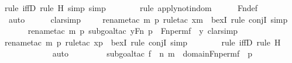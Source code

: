 \begin{isabellebody}
{\isacharparenleft}{\kern0pt}rule\ iffD{}{\isacharcomma}{\kern0pt}\ rule\ H{\isacharcomma}{\kern0pt}\ simp{\isacharcomma}{\kern0pt}\ simp{\isacharparenright}{\kern0pt}\isanewline
\ \ \ \ \ \ \ \isamarkupfalse%
{\isacharparenleft}{\kern0pt}rule\ apply{\isacharunderscore}{\kern0pt}not{}{\isacharunderscore}{\kern0pt}indom{\isacharparenright}{\kern0pt}\isanewline
\ \ \ \ \isamarkupfalse%
\ Fn{\isacharunderscore}{\kern0pt}def\ \isanewline
\ \ \ \ \ \ \ \ \isamarkupfalse%
\ auto{\isacharbrackleft}{\kern0pt}{}{\isacharbrackright}{\kern0pt}\isanewline
\ \ \ \ \isamarkupfalse%
\ clarsimp\isanewline
\ \ \ \ \isamarkupfalse%
{\isacharparenleft}{\kern0pt}rename{\isacharunderscore}{\kern0pt}tac\ m\ p{\isacharcomma}{\kern0pt}\ rule{\isacharunderscore}{\kern0pt}tac\ x{\isacharequal}{\kern0pt}m\ \ bexI{\isacharcomma}{\kern0pt}\ rule\ conjI{\isacharcomma}{\kern0pt}\ simp{\isacharparenright}{\kern0pt}\isanewline
\ \ \ \ \ \isamarkupfalse%
{\isacharparenleft}{\kern0pt}rename{\isacharunderscore}{\kern0pt}tac\ m\ p{\isacharcomma}{\kern0pt}\ subgoal{\isacharunderscore}{\kern0pt}tac\ {\isachardoublequoteopen}{\isasymexists}y{\isasymin}Fn{\isachardot}{\kern0pt}\ p\ {\isacharequal}{\kern0pt}\ Fn{\isacharunderscore}{\kern0pt}perm{\isacharprime}{\kern0pt}{\isacharparenleft}{\kern0pt}f{\isacharparenright}{\kern0pt}\ {\isacharbackquote}{\kern0pt}\ y{\isachardoublequoteclose}{\isacharcomma}{\kern0pt}\ clarsimp{\isacharparenright}{\kern0pt}\isanewline
\ \ \ \ \ \ \isamarkupfalse%
{\isacharparenleft}{\kern0pt}rename{\isacharunderscore}{\kern0pt}tac\ m\ p{\isacharcomma}{\kern0pt}\ rule{\isacharunderscore}{\kern0pt}tac\ x{\isacharequal}{\kern0pt}p\ \ bexI{\isacharcomma}{\kern0pt}\ rule\ conjI{\isacharcomma}{\kern0pt}\ simp{\isacharparenright}{\kern0pt}\isanewline
\ \ \ \ \ \ \ \isamarkupfalse%
{\isacharparenleft}{\kern0pt}rule\ iffD{}{\isacharcomma}{\kern0pt}\ rule\ H{\isacharparenright}{\kern0pt}\isanewline
\ \ \ \ \ \ \ \ \ \ \isamarkupfalse%
\ auto{\isacharbrackleft}{\kern0pt}{}{\isacharbrackright}{\kern0pt}\isanewline
\ \ \ \ \ \ \ \ \isamarkupfalse%
{\isacharparenleft}{\kern0pt}subgoal{\isacharunderscore}{\kern0pt}tac\ {\isachardoublequoteopen}{\isasymlangle}f\ {\isacharbackquote}{\kern0pt}\ n{\isacharcomma}{\kern0pt}\ m{\isasymrangle}\ {\isasymin}\ domain{\isacharparenleft}{\kern0pt}Fn{\isacharunderscore}{\kern0pt}perm{\isacharprime}{\kern0pt}{\isacharparenleft}{\kern0pt}f{\isacharparenright}{\kern0pt}\ {\isacharbackquote}{\kern0pt}\ p{\isacharparenright}{\kern0pt}{\isachardoublequoteclose}{\isacharparenright}{\kern0pt}\isanewline

\end{isabellebody}
